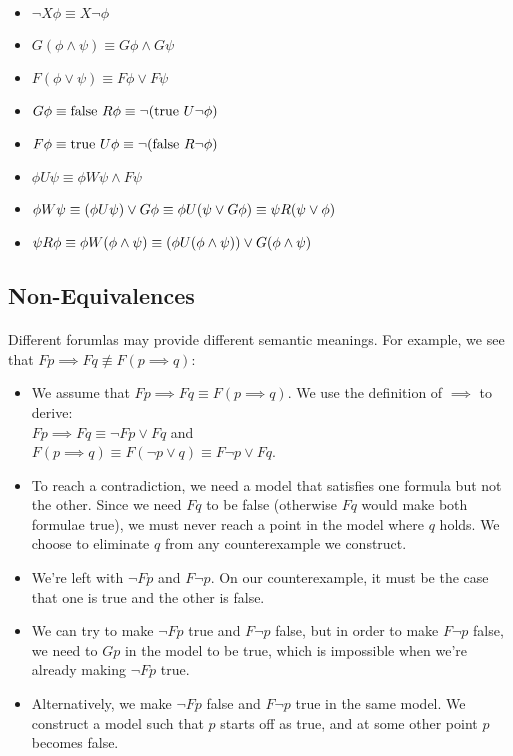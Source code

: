 \documentclass{article}
\theoremstyle{plain}
\theoremstyle{definition}
\begin{document}
\begin{multicols}{2}
\begin{itemize}
\item $\lnot X\phi \equiv X \lnot\phi$
\item $G(\phi \land \psi) \equiv G\phi \land G\psi$
\item $F(\phi \lor \psi) \equiv F\phi \lor F\psi$
\item $G\phi \equiv \text{false}\ R \phi\\ \equiv \lnot (\text{true}\ U \lnot\phi)$
\item $F\phi \equiv \text{true}\ U \phi\\ \equiv \lnot (\text{false}\ R \lnot\phi)$
\item $\phi U \psi \equiv \phi W \psi \land F\psi$
\item $\phi W \psi \equiv (\phi U \psi) \lor G\phi\\
 \equiv \phi U (\psi \lor G\phi)\\
 \equiv \psi R (\psi \lor \phi)$
\item $\psi R \phi \equiv \phi W (\phi \land \psi)\\
 \equiv (\phi U (\phi \land \psi)) \lor G(\phi \land \psi)$
\end{itemize}

\subsection{Non-Equivalences}

\paragraph{} Different forumlas may provide different semantic meanings. For example, we see that $Fp \implies Fq \not\equiv F(p \implies q)$:

\begin{itemize}
\item[] We assume that $Fp \implies Fq \equiv F(p \implies q)$. We use the definition of $\implies$ to derive:\\ $Fp \implies Fq \equiv \lnot Fp \lor Fq$ and\\ $F(p \implies q) \equiv F(\lnot p \lor q) \equiv F\lnot p \lor Fq$.
\item[] To reach a contradiction, we need a model that satisfies one formula but not the other. Since we need $Fq$ to be false (otherwise $Fq$ would make both formulae true), we must never reach a point in the model where $q$ holds. We choose to eliminate $q$ from any counterexample we construct.
\item[] We're left with $\lnot Fp$ and $F\lnot p$. On our counterexample, it must be the case that one is true and the other is false.
\item[] We can try to make $\lnot Fp$ true and $F\lnot p$ false, but in order to make $F\lnot p$ false, we need to $Gp$ in the model to be true, which is impossible when we're already making $\lnot Fp$ true.
\item[] Alternatively, we make $\lnot Fp$ false and $F\lnot p$ true in the same model. We construct a model such that $p$ starts off as true, and at some other point $p$ becomes false. 
\end{itemize}


\end{multicols}
\end{document}
